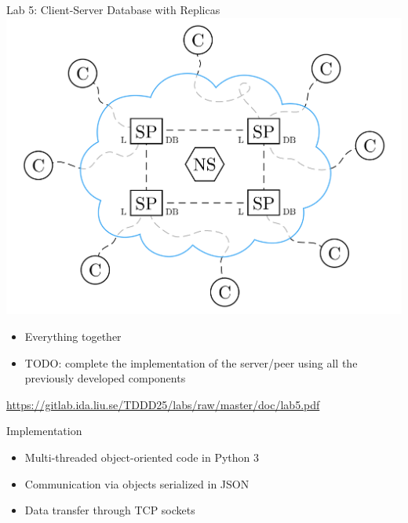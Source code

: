 \documentclass[compress,xcolor=table]{beamer}
\begin{document}
\begin{frame}{Lab 5: Client-Server Database with Replicas}
  \centering
  \includegraphics[scale=0.10,page=1]{include/assets/distributed-database}
  \begin{itemize}
    \item Everything together
    \item \alert{TODO}: complete the implementation of the server/peer using all the previously developed components
  \end{itemize}
  \begin{center}
    \scriptsize \url{https://gitlab.ida.liu.se/TDDD25/labs/raw/master/doc/lab5.pdf}
  \end{center}
\end{frame}

\begin{frame}{Implementation}
  \begin{itemize}
    \item Multi-threaded object-oriented code in Python 3
    \item Communication via objects serialized in JSON
    \item Data transfer through TCP sockets
  \end{itemize}
\end{frame}
\end{document}
